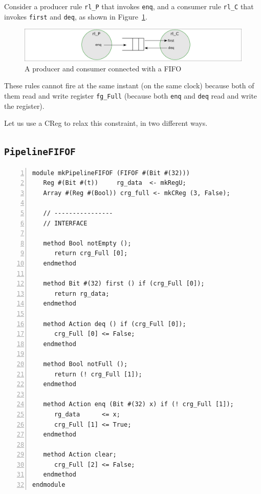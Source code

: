 Consider a producer rule \verb|rl_P| that invokes \verb|enq|, and a
consumer rule \verb|rl_C| that invokes \verb|first| and \verb|deq|,
as shown in Figure~\ref{Fig_FIFO_Producer_Consumer}.
\begin{figure}[htbp]
  \centerline{\includegraphics[width=6in,angle=0]{Figures/Fig_FIFO_Producer_Consumer}}
  \caption{\label{Fig_FIFO_Producer_Consumer}A producer and consumer connected with a FIFO}
\end{figure}

These rules cannot fire at the same instant (on the same clock)
because both of them read and write register \verb|fg_Full| (because
both \verb|enq| and \verb|deq| read and write the register).

Let us use a CReg to relax this constraint, in two different ways.


\subsection{{\tt PipelineFIFOF}}

{\small
\begin{Verbatim}[frame=single, numbers=left]
module mkPipelineFIFOF (FIFOF #(Bit #(32)))
   Reg #(Bit #(t))     rg_data  <- mkRegU;
   Array #(Reg #(Bool)) crg_full <- mkCReg (3, False);

   // ----------------
   // INTERFACE

   method Bool notEmpty ();
      return crg_Full [0];
   endmethod

   method Bit #(32) first () if (crg_Full [0]);
      return rg_data;
   endmethod

   method Action deq () if (crg_Full [0]);
      crg_Full [0] <= False;
   endmethod

   method Bool notFull ();
      return (! crg_Full [1]);
   endmethod

   method Action enq (Bit #(32) x) if (! crg_Full [1]);
      rg_data      <= x;
      crg_Full [1] <= True;
   endmethod

   method Action clear;
      crg_Full [2] <= False;
   endmethod
endmodule
\end{Verbatim}
}

